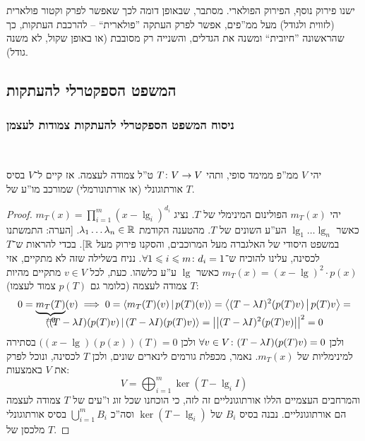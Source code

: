 \documentclass[name=רשימות אלגברה לינארית 2א]{../../../tex/classes/megasumPreamble}
\begin{document}
	ישנו פירוק נוסף, הפירוק הפולארי. מסתבר, שבאופן דומה לכך שאפשר לפרק וקטור פולארית (לזווית ולגודל) מעל ממ''פים, אפשר לפרק העתקה ''פולארית`` – להרכבת העתקות, כך שהראשונה ''חיובית`` ומשנה את הגדלים, והשנייה רק מסובבת (או באופן שקול, לא משנה גודל). 
	
	\subsection{המשפט הספקטרלי להעתקות}
	\subsubsection{ניסוח המשפט הספקטרלי להעתקות צמודות לעצמן}\ 
	\begin{Theorem}
		יהי $V$ ממ''פ ממימד סופי, ותהי $T \colon V \to V$ ט''ל צמודה לעצמה. אז קיים ל־$V$ בסיס אורתוגונלי (או אורתונורמלי) שמורכב מו''ע של $T$. 
	\end{Theorem} \begin{proof}
		יהי $m_T(x)$ הפולינום המינימלי של $T$. נציג $m_T(x) = \prod_{i = 1}^{m}(x - \lg_i)^{d_i}$ כאשר $\lg_1 \dots \lg_n$ הע''ע השונים של $T$. מהטענה הקודמת $\lambda_1 \dots \lambda_n \in \mathbb{R}$. [הערה: התמשתנו במשפט היסודי של האלגברה מעל המרוכבים, והסקנו פירוק מעל $\mathbb{R}$]. בכדי להראות ש־$T$ לכסינה, עלינו להוכיח ש־$\forall 1 \leqslant i \leqslant m \colon d_i = 1$. נניח בשלילה שזה לא מתקיים, אזי $m_T(x) = (x - \lg)^2 \cdot p(x)$ כאשר $\lg$ ע''ע כלשהו. כעת, לכל $v \in V$ מתקיים מהיות $T$ צמודה לעצמה (כלומר גם $p(T)$ צמוד לעצמו): 
		\begin{multline*}
			0 = \smash{\underbrace{m_T(T)}_{=0}(v)} \implies 0 = \left \langle m_T(T)(v) \,\middle|\, p(T)(v) \right \rangle = \left \langle (T - \lambda I)^{2}(p(T)v) \,\middle|\, p(T)v \right \rangle =
			\\ \left \langle (T - \lambda I)(p(T)v) \,\middle|\, (T - \lambda I)(p(T)v) \right \rangle = \left \vert \left \vert (T - \lambda I)^2(p(T)v) \right \vert \right \vert^2 = 0
		\end{multline*}
		ולכן $\forall v \in V \colon (T - \lambda I)(p(T)v) = 0$ ולכן $((x - \lg)(p(x))(T) = 0$ בסתירה למינימליות של $m_T(x)$. נאמר, מכפלת גורמים לינארים שונים, ולכן $T$ לכסינה, ונוכל לפרק את $V$ באמצעות: 
		\[ V = \bigoplus_{i = 1}^{m} \ker (T - \lg_i I) \]
		והמרחבים העצמיים הללו אורתוגונליים זה לזה, כי הוכחנו שכל זוג ו''עים של $T$ צמודה לעצמה הם אורתוגונליים. 
		נבנה בסיס $B_i$ של $\ker (T - \lg_i)$ וסה''כ $\bigcup_{i = 1}^{m} B_i$ בסיס אורתוגונלי מלכסן של $T$. 
	\end{proof}
\end{document}
